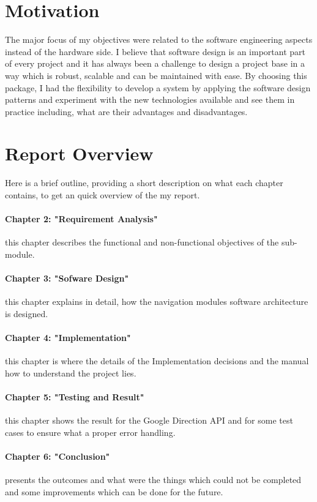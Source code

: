 	\section{Motivation}
		The major focus of my objectives were related to the software engineering aspects instead of
		the hardware side. I believe that software design is an important part of every project and
		it has always been a challenge to design a project base
		in a way which is robust, scalable and can be maintained with ease. By choosing this package,
		I had the flexibility to develop a system by applying the software design patterns and experiment with 
		the new	technologies available and see them in practice including, what are 
		their advantages and disadvantages. 

	\section{Report Overview}
		Here is a brief outline, providing a short description on what each chapter contains, to get an
		quick overview of the my report.
		
		\paragraph{Chapter 2: "Requirement Analysis"}
			this chapter describes the functional and non-functional objectives of the sub-module. 
		\paragraph{Chapter 3: "Sofware Design"}
			this chapter explains in detail, how the navigation modules software architecture is designed. 
		\paragraph{Chapter 4: "Implementation"} 
			this chapter is where the details of the Implementation decisions and the manual how to understand 
			the project lies.
		\paragraph{Chapter 5: "Testing and Result"}
			this chapter shows the result for the Google Direction API and for some test cases to ensure what 
			a proper error handling. 
		\paragraph{Chapter 6: "Conclusion"} 
			presents the outcomes and what were the things which could not be completed and some improvements
			which can be done for the future.

